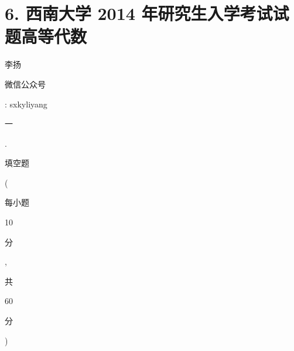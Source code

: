 \documentclass[10pt]{article}
\begin{document}
\section{6. 西南大学 2014 年研究生入学考试试题高等代数}
\begin{CJK}{UTF8}{mj}李扬\end{CJK}

\begin{CJK}{UTF8}{mj}微信公众号\end{CJK}: sxkyliyang

\begin{CJK}{UTF8}{mj}一\end{CJK}. \begin{CJK}{UTF8}{mj}填空题\end{CJK}(\begin{CJK}{UTF8}{mj}每小题\end{CJK} 10 \begin{CJK}{UTF8}{mj}分\end{CJK}, \begin{CJK}{UTF8}{mj}共\end{CJK} 60 \begin{CJK}{UTF8}{mj}分\end{CJK})
\end{document}
